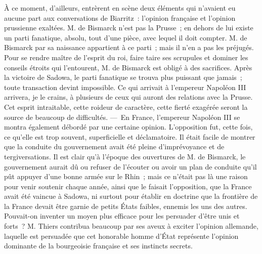 \documentclass[french,twoside]{book} %
\begin{document}
À ce moment, d’ailleurs, entrèrent en scène deux éléments qui n’avaient eu aucune part aux conversations de Biarritz : l’opinion française et l’opinion prussienne exaltées. M. de Bismarck n’est pas la Prusse ; en dehors de lui existe un parti fanatique, absolu, tout d’une pièce, avec lequel il doit compter. M. de Bismarck par sa naissance appartient à ce parti ; mais il n’en a pas les préjugés. Pour se rendre maître de l’esprit du roi, faire taire ses scrupules et dominer les conseils étroits qui l’entourent, M. de Bismarck est obligé à des sacrifices. Après la victoire de Sadowa, le parti fanatique se trouva plus puissant que jamais ; toute transaction devint impossible. Ce qui arrivait à l’empereur Napoléon III arrivera, je le crains, à plusieurs de ceux qui auront des relations avec la Prusse. Cet esprit intraitable, cette roideur de caractère, cette fierté exagérée seront la source de beaucoup de difficultés. — En France, l’empereur Napoléon III se montra également débordé par une certaine opinion. L’opposition fut, cette fois, ce qu’elle est trop souvent, superficielle et déclamatoire. Il était facile de montrer que la conduite du gouvernement avait été pleine d’imprévoyance et de tergiversations. Il est clair qu’à l’époque des ouvertures de M. de Bismarck, le gouvernement aurait dû ou refuser de l’écouter ou avoir un plan de conduite qu’il pût appuyer d’une bonne armée sur le Rhin ; mais ce n’était pas là une raison pour venir soutenir chaque année, ainsi que le faisait l’opposition, que la France avait été vaincue à Sadowa, ni surtout pour établir en doctrine que la frontière de la France devait être garnie de petits États faibles, ennemis les uns des autres. Pouvait-on inventer un moyen plus efficace pour les persuader d’être unis et forts ? M. Thiers contribua beaucoup par ses aveux à exciter l’opinion allemande, laquelle est persuadée que cet honorable homme d’État représente l’opinion dominante de la bourgeoisie française et ses instincts secrets.\par
\end{document}
